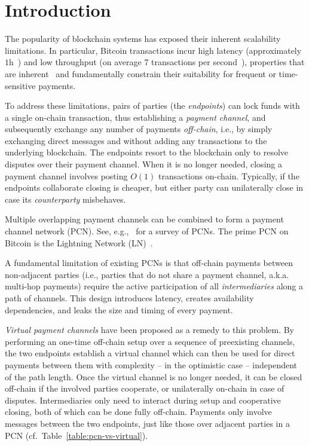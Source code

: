 \section{Introduction}
The popularity of blockchain systems has exposed their inherent scalability
limitations. In particular, Bitcoin transactions incur high latency
(approximately $1$h~\cite{bitcoin}) and low throughput (on average 7 transactions
per second~\cite{scaling}), properties that are inherent~\cite{scaling} and
fundamentally constrain their suitability for frequent or time-sensitive
payments.

To address these limitations, pairs of parties (the \emph{endpoints}) can lock
funds with a single on-chain transaction, thus establishing a \emph{payment channel},
and subsequently exchange any number of payments \emph{off-chain}, i.e., by simply exchanging
direct messages and without adding any transactions to the underlying
blockchain. The endpoints resort to the blockchain only to resolve disputes over
their payment channel. When it is no longer needed, closing a payment channel
involves posting $O(1)$ transactions on-chain. Typically, if the endpoints
collaborate closing is cheaper, but either party can unilaterally close in case
its \emph{counterparty} misbehaves.

Multiple overlapping payment channels can be combined to
form a payment channel network (PCN). See,
e.g.,~\cite{DBLP:conf/fc/GudgeonMRMG20} for a survey of PCNs. The prime PCN on
Bitcoin is the Lightning Network (LN)~\cite{lightning}.


A fundamental limitation of existing PCNs is that off-chain payments between
non-adjacent parties (i.e., parties that do not share a payment channel, a.k.a.
multi-hop payments) require the active participation of all
\emph{intermediaries} along
a path of channels. This design introduces latency, creates availability
dependencies, and leaks the size and timing of every payment.

\emph{Virtual payment channels} have been proposed as a remedy to this problem.
By performing an one-time off-chain setup over a sequence of preexisting
channels, the two endpoints establish a virtual channel which can then
be used for direct payments between them with complexity -- in the optimistic case --
independent of the path length. Once the virtual channel is no longer needed, it
can be closed off-chain if the involved parties cooperate, or unilaterally
on-chain in case of disputes. Intermediaries only need to interact during setup
and cooperative closing, both of which can be done fully off-chain. Payments
only involve messages between the two endpoints, just like those over adjacent
parties in a PCN (cf.\ Table~\ref{table:pcn-vs-virtual}).


